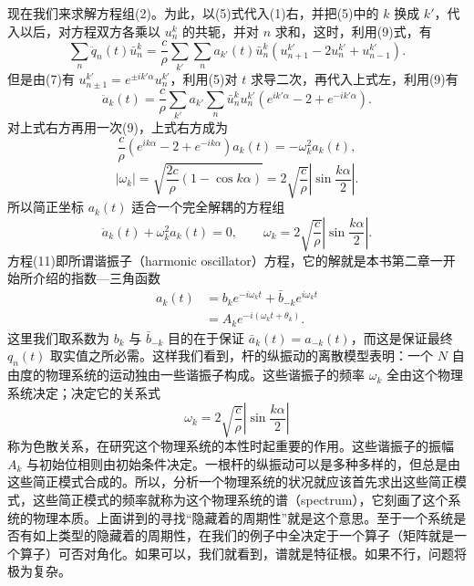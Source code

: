 现在我们来求解方程组(2)。为此，以(5)式代入(1)右，并把(5)中的 $k$ 换成 $k'$，代入以后，对方程双方各乘以 $u_n^k$ 的共轭，并对 $n$ 求和，这时，利用(9)式，有
\[
 \sum_n \ddot q_n(t)\bar u_n^k
 =\frac{c}{\rho}\sum_{k'}\sum_n a_{k'}(t)\bar u_n^k
 (u_{n+1}^{k'}-2u_n^{k'}+u_{n-1}^{k'}).
\]
但是由(7)有 $u_{n\pm1}^{k'}=e^{\pm ik'\alpha}u_n^{k'}$，利用(5)对 $t$ 求导二次，再代入上式左，利用(9)有
\[
 \ddot a_k(t)=\frac{c}{\rho}\sum_{k'}a_{k'}\sum_n\bar u_n^k u_n^{k'}
 (e^{ik'\alpha}-2+e^{-ik'\alpha}).
\]
对上式右方再用一次(9)，上式右方成为
\[
 \frac{c}{\rho}(e^{ik\alpha}-2+e^{-ik\alpha})a_k(t)=-\omega_k^2a_k(t),
\]
\[
 |\omega_k|=\sqrt{\frac{2c}{\rho}(1-\cos k\alpha)}
 =2\sqrt{\frac c\rho}\left|\sin\frac{k\alpha}{2}\right|.
\]
所以简正坐标 $a_k(t)$ 适合一个完全解耦的方程组
\begin{equation}
 \ddot a_k(t)+\omega_k^2a_k(t)=0,
 \qquad
 \omega_k=2\sqrt{\frac c\rho}\left|\sin\frac{k\alpha}{2}\right|.
 \tag{11}
\end{equation}
方程(11)即所谓谐振子（harmonic oscillator）方程，它的解就是本书第二章一开始所介绍的指数—三角函数
\begin{equation}
 \begin{aligned}
 a_k(t)&=b_ke^{-i\omega_kt}+\bar b_{-k}e^{i\omega_kt}\\
 &=A_ke^{-i(\omega_kt+\theta_k)}.
 \end{aligned}
 \tag{12}
\end{equation}
这里我们取系数为 $b_k$ 与 $\bar b_{-k}$ 目的在于保证 $\bar a_k(t)=a_{-k}(t)$，而这是保证最终 $q_n(t)$ 取实值之所必需。这样我们看到，杆的纵振动的离散模型表明：一个 $N$ 自由度的物理系统的运动独由一些谐振子构成。这些谐振子的频率 $\omega_k$ 全由这个物理系统决定；决定它的关系式
\[
 \omega_k=2\sqrt{\frac c\rho}\left|\sin\frac{k\alpha}{2}\right|
\]
称为色散关系，在研究这个物理系统的本性时起重要的作用。这些谐振子的振幅 $A_k$ 与初始位相则由初始条件决定。一根杆的纵振动可以是多种多样的，但总是由这些简正模式合成的。所以，分析一个物理系统的状况就应该首先求出这些简正模式，这些简正模式的频率就称为这个物理系统的谱（spectrum），它刻画了这个系统的物理本质。上面讲到的寻找“隐藏着的周期性”就是这个意思。至于一个系统是否有如上类型的隐藏着的周期性，在我们的例子中全决定于一个算子（矩阵就是一个算子）可否对角化。如果可以，我们就看到，谱就是特征根。如果不行，问题将极为复杂。

